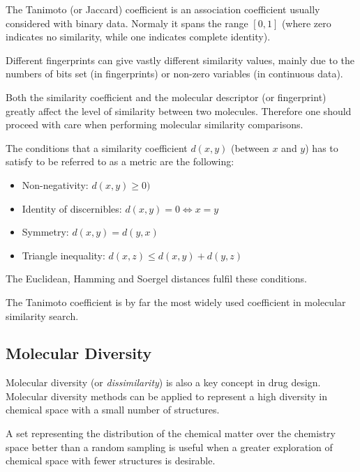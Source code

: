The Tanimoto (or Jaccard) coefficient is an association coefficient usually considered with binary data. Normaly it spans the range $[0,1]$ (where zero indicates no similarity, while one indicates complete identity).

Different fingerprints can give vastly different similarity values, mainly due to the numbers of bits set (in fingerprints) or non-zero variables (in continuous data).

Both the similarity coefficient and the molecular descriptor (or fingerprint) greatly affect the level of similarity between two molecules. Therefore one should proceed with care when performing molecular similarity comparisons.

The conditions that a similarity coefficient $d(x,y)$ (between $x$ and $y$) has to satisfy to be referred to as a metric are the following:
\begin{itemize}
    \item Non-negativity: $d(x,y) \geq 0)$
    \item Identity of discernibles: $d(x,y) = 0 \iff x = y$
    \item Symmetry: $d(x,y) = d(y,x)$
    \item Triangle inequality: $d(x,z) \leq d(x,y) + d(y,z)$
\end{itemize}
The Euclidean, Hamming and Soergel distances fulfil these conditions.

The Tanimoto coefficient is by far the most widely used coefficient in molecular similarity search.


\subsection{Molecular Diversity}

Molecular diversity (or \emph{dissimilarity}) is also a key concept in drug design. Molecular diversity methods can be applied to represent a high diversity in chemical space with a small number of structures.

A set representing the distribution of the chemical matter over the chemistry space better than a random sampling is useful when a greater exploration of chemical space with fewer structures is desirable.